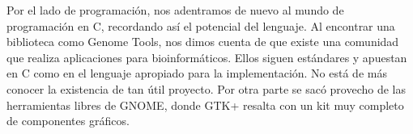 \documentclass{article}
\begin{document}
	Por el lado de programación, nos adentramos de nuevo al mundo de programación en C, recordando así el potencial del lenguaje. Al encontrar una biblioteca como Genome Tools, nos dimos cuenta de que existe una comunidad que realiza aplicaciones para bioinformáticos. Ellos siguen estándares y apuestan en C como en el lenguaje apropiado para la implementación. No está de más conocer la existencia de tan útil proyecto. Por otra parte se sacó provecho de las herramientas libres de GNOME, donde GTK+ resalta con un kit muy completo de componentes gráficos.
	
	\pagebreak
	
	
	
\end{document}
